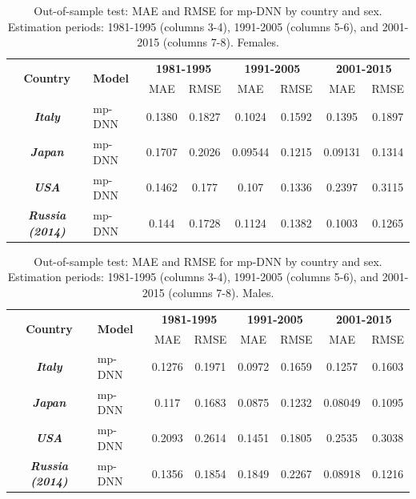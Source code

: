\documentclass[a4,11pt]{article}
\begin{document}
\begin{table}[H]
\centering
\caption{Out-of-sample test: MAE and RMSE for mp-DNN by country and sex. Estimation periods: 1981-1995 (columns 3-4), 1991-2005 (columns 5-6), and 2001-2015 (columns 7-8). Females.}
\label{tab:3}
\footnotesize	
\begin{tabular}{cl|cc|cc|cc}
\hline 		
\multirow{2}{*}{\textbf{Country}} & \multirow{2}{*}{\textbf{Model}} & \multicolumn{2}{c|}{\textbf{1981-1995}} & \multicolumn{2}{c}{\textbf{1991-2005}} & \multicolumn{2}{c}{\textbf{2001-2015}}\tabularnewline
\cline{3-8}  & & MAE & RMSE & MAE & RMSE & MAE & RMSE\tabularnewline
\hline 
\multirow{1}{*}{\textbf{\textit{Italy}}} &  \multirow{1}{*}{mp-DNN} &0.1380 & 0.1827 & 0.1024 & 0.1592 & 0.1395 & 0.1897 \tabularnewline 	 		
\hline 
\multirow{1}{*}{\textbf{\textit{Japan}}} & \multirow{1}{*}{mp-DNN} &0.1707& 0.2026& 0.09544 &0.1215 & 0.09131 & 0.1314 \tabularnewline 	 		
\hline 
\multirow{1}{*}{\textbf{\textit{USA}}} & \multirow{1}{*}{mp-DNN} &0.1462 & 0.177 & 0.107 & 0.1336 & 0.2397 & 0.3115 \tabularnewline 	 		
\hline 
\multirow{1}{*}{\textbf{\textit{Russia (2014)}}} & \multirow{1}{*}{mp-DNN} &0.144 & 0.1728 & 0.1124 & 0.1382 & 0.1003 & 0.1265 \tabularnewline 	 		
\hline 
\end{tabular}
\end{table}

\begin{table}[H]
\centering
\caption{Out-of-sample test: MAE and RMSE for mp-DNN by country and sex. Estimation periods: 1981-1995 (columns 3-4), 1991-2005 (columns 5-6), and 2001-2015 (columns 7-8). Males.}
\label{tab:4}
\footnotesize	
\begin{tabular}{cl|cc|cc|cc}
\hline 		
\multirow{2}{*}{\textbf{Country}} & \multirow{2}{*}{\textbf{Model}} & \multicolumn{2}{c|}{\textbf{1981-1995}} & \multicolumn{2}{c}{\textbf{1991-2005}} & \multicolumn{2}{c}{\textbf{2001-2015}}\tabularnewline
\cline{3-8} & & MAE & RMSE & MAE & RMSE & MAE & RMSE\tabularnewline
\hline 
\multirow{1}{*}{\textbf{\textit{Italy}}}& \multirow{1}{*}{mp-DNN} &0.1276 & 0.1971 & 0.0972 & 0.1659 & 0.1257 & 0.1603 \tabularnewline 	 		
\hline 
\multirow{1}{*}{\textbf{\textit{Japan}}} & \multirow{1}{*}{mp-DNN} &0.117 & 0.1683 & 0.0875 & 0.1232 & 0.08049 &0.1095 \tabularnewline 	 
\hline
 \multirow{1}{*}{\textbf{\textit{USA}}}& \multirow{1}{*}{mp-DNN} &0.2093 & 0.2614 & 0.1451 & 0.1805 & 0.2535 & 0.3038 \tabularnewline 	 		
\hline 
\multirow{1}{*}{\textbf{\textit{Russia (2014)}}}& \multirow{1}{*}{mp-DNN} &0.1356 & 0.1854 & 0.1849 & 0.2267& 0.08918 & 0.1216 \tabularnewline 	 		
\hline 
\end{tabular}
\end{table}
\end{document}
